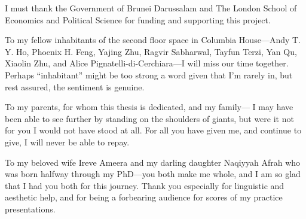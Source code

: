 \documentclass[11pt,twoside,openright]{report}
\begin{document}
I must thank the Government of Brunei Darussalam and The London School of Economics and Political Science for funding and supporting this project.

To my fellow inhabitants of the second floor space in Columbia House---Andy T. Y. Ho, Phoenix H. Feng, Yajing Zhu, Ragvir Sabharwal, Tayfun Terzi, Yan Qu, Xiaolin Zhu, and Alice Pignatelli-di-Cerchiara---I will miss our time together.
Perhaps ``inhabitant'' might be too strong a word given that I'm rarely in, but rest assured, the sentiment is genuine.

To my parents, for whom this thesis is dedicated, and my family---
I may have been able to see further by standing on the shoulders of giants, but were it not for you I would not have stood at all.
For all you have given me, and continue to give, I will never be able to repay.

To my beloved wife Ireve Ameera and my darling daughter Naqiyyah Afrah who was born halfway through my PhD---you both make me whole, and I am so glad that I had you both for this journey.
Thank you especially for linguistic and aesthetic help, and for being a forbearing audience for scores of my practice presentations.
\end{document}
